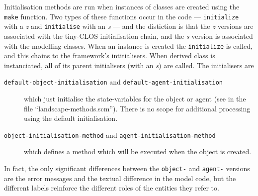 Initialisation methods are run when instances of classes are created
using the \texttt{make} function.  Two types of these functions occur
in the code --- \texttt{initialize} with a \emph{z} and
\texttt{initialise} with an \emph{s} --- and the distiction is that
the \emph{z} versions are associated with the tiny-CLOS initialisation
chain, and the \emph{s} version is associated with the modelling
classes. When an instance is created the 
\texttt{initialize} is called, and this chains to the framework's
intitialisers.  When  derived class is instanciated, all of
its parent initialisers (with an \emph{s}) are called.  The
initialisers are
\begin{description}
  \item[\texttt{default-object-initialisation} and
    \texttt{default-agent-initialisation}] which just initialise the
    state-variables for the object or agent (see  in the
    file ``landscape-methods.scm''). There is no scope for additional
    processing using the default initialisation.
  \item[\texttt{object-initialisation-method} and
    \texttt{agent-initialisation-method}] which defines a method which
    will be executed when the object is created.
\end{description}
In fact, the only significant differences between the \texttt{object-}
and \texttt{agent-} versions are the error messages and the textual
difference in the model code, but the different labels reinforce the
different roles of the entities they refer to.
    

